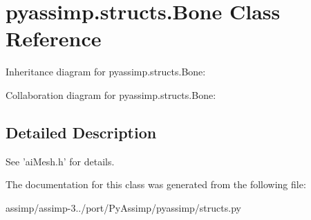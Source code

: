 \hypertarget{classpyassimp_1_1structs_1_1_bone}{\section{pyassimp.\+structs.\+Bone Class Reference}
\label{classpyassimp_1_1structs_1_1_bone}
}


Inheritance diagram for pyassimp.\+structs.\+Bone\+:


Collaboration diagram for pyassimp.\+structs.\+Bone\+:


\subsection{Detailed Description}
\begin{DoxyVerb}See 'aiMesh.h' for details.
\end{DoxyVerb}
 

The documentation for this class was generated from the following file\+:\begin{DoxyCompactItemize}
\item 
assimp/assimp-\/3../port/\+Py\+Assimp/pyassimp/structs.\+py\end{DoxyCompactItemize}
